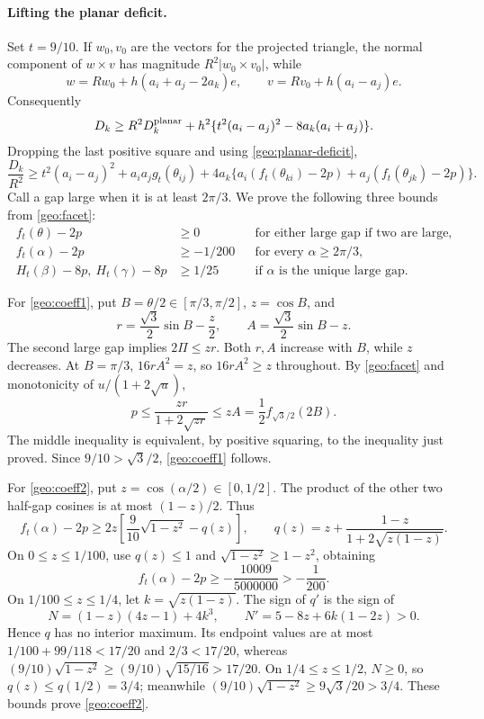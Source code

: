 \paragraph{Lifting the planar deficit.}
Set \(t=9/10\). If \(w_0,v_0\) are the vectors for the projected
triangle, the normal component of \(w\times v\) has magnitude
\(R^2|w_0\times v_0|\), while
\[
 w=Rw_0+h(a_i+a_j-2a_k)e,\qquad
 v=Rv_0+h(a_i-a_j)e.
\]
Consequently
\[
 D_k\ge R^2D_k^{\rm planar}
 +h^2\{t^2(a_i-a_j)^2-8a_k(a_i+a_j)\}.
\]
Dropping the last positive square and using
\eqref{geo:planar-deficit},
\begin{equation}
 \frac{D_k}{R^2}\ge
 t^2(a_i-a_j)^2+a_ia_jg_t(\theta_{ij})
 +4a_k\{a_i(f_t(\theta_{ki})-2p)
             +a_j(f_t(\theta_{jk})-2p)\}.
 \label{geo:lifted}
\end{equation}
Call a gap large when it is at least $2\pi/3$. We prove the following
three bounds from \eqref{geo:facet}:
\begin{align}
 f_t(\theta)-2p&\ge0
 &&\text{for either large gap if two are large},
 \label{geo:coeff1}\\
 f_t(\alpha)-2p&\ge-1/200
 &&\text{for every }\alpha\ge2\pi/3,
 \label{geo:coeff2}\\
 H_t(\beta)-8p,\ H_t(\gamma)-8p&\ge1/25
 &&\text{if }\alpha\text{ is the unique large gap}.
 \label{geo:coeff3}
\end{align}

For \eqref{geo:coeff1}, put \(B=\theta/2\in[\pi/3,\pi/2]\),
\(z=\cos B\), and
\[
 r=\frac{\sqrt3}{2}\sin B-\frac z2,\qquad
 A=\frac{\sqrt3}{2}\sin B-z.
\]
The second large gap implies \(2\Pi\le zr\).
Both \(r,A\) increase with \(B\), while \(z\) decreases.
At \(B=\pi/3\), \(16rA^2=z\), so \(16rA^2\ge z\) throughout.
By \eqref{geo:facet} and monotonicity of \(u/(1+2\sqrt u)\),
\[
 p\le\frac{zr}{1+2\sqrt{zr}}\le zA
 =\frac12 f_{\sqrt3/2}(2B).
\]
The middle inequality is equivalent, by positive squaring, to the
inequality just proved. Since \(9/10>\sqrt3/2\),
\eqref{geo:coeff1} follows.

For \eqref{geo:coeff2}, put \(z=\cos(\alpha/2)\in[0,1/2]\).
The product of the other two half-gap cosines is at most
\((1-z)/2\). Thus
\[
 f_t(\alpha)-2p
 \ge2z\left[\frac9{10}\sqrt{1-z^2}-q(z)\right],\qquad
 q(z)=z+\frac{1-z}{1+2\sqrt{z(1-z)}}.
\]
On \(0\le z\le1/100\), use \(q(z)\le1\) and
\(\sqrt{1-z^2}\ge1-z^2\), obtaining
\[
 f_t(\alpha)-2p
 \ge-\frac{10009}{5000000}>-\frac1{200}.
\]
On \(1/100\le z\le1/4\), let \(k=\sqrt{z(1-z)}\).
The sign of \(q'\) is the sign of
\[
 N=(1-z)(4z-1)+4k^3,\qquad N'=5-8z+6k(1-2z)>0.
\]
Hence \(q\) has no interior maximum. Its endpoint values are at
most \(1/100+99/118<17/20\) and \(2/3<17/20\), whereas
\((9/10)\sqrt{1-z^2}\ge(9/10)\sqrt{15/16}>17/20\).
On \(1/4\le z\le1/2\), \(N\ge0\), so \(q(z)\le q(1/2)=3/4\);
meanwhile \((9/10)\sqrt{1-z^2}\ge9\sqrt3/20>3/4\).
These bounds prove \eqref{geo:coeff2}.

